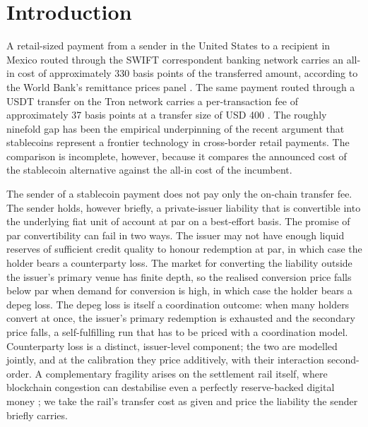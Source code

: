 \section{Introduction}\label{sec:introduction}

A retail-sized payment from a sender in the United States to a recipient in Mexico routed through the SWIFT correspondent banking network carries an all-in cost of approximately 330 basis points of the transferred amount, according to the World Bank's remittance prices panel \citep{rpw_q3_2025}. The same payment routed through a USDT transfer on the Tron network carries a per-transaction fee of approximately 37 basis points at a transfer size of USD 400 \citep{tronsave_blog_2026}. The roughly ninefold gap has been the empirical underpinning of the recent argument that stablecoins represent a frontier technology in cross-border retail payments. The comparison is incomplete, however, because it compares the announced cost of the stablecoin alternative against the all-in cost of the incumbent.

The sender of a stablecoin payment does not pay only the on-chain transfer fee. The sender holds, however briefly, a private-issuer liability that is convertible into the underlying fiat unit of account at par on a best-effort basis. The promise of par convertibility can fail in two ways. The issuer may not have enough liquid reserves of sufficient credit quality to honour redemption at par, in which case the holder bears a counterparty loss. The market for converting the liability outside the issuer's primary venue has finite depth, so the realised conversion price falls below par when demand for conversion is high, in which case the holder bears a depeg loss. The depeg loss is itself a coordination outcome: when many holders convert at once, the issuer's primary redemption is exhausted and the secondary price falls, a self-fulfilling run that has to be priced with a coordination model. Counterparty loss is a distinct, issuer-level component; the two are modelled jointly, and at the calibration they price additively, with their interaction second-order. A complementary fragility arises on the settlement rail itself, where blockchain congestion can destabilise even a perfectly reserve-backed digital money \citep{klee_etal_2026_fragility}; we take the rail's transfer cost as given and price the liability the sender briefly carries.

